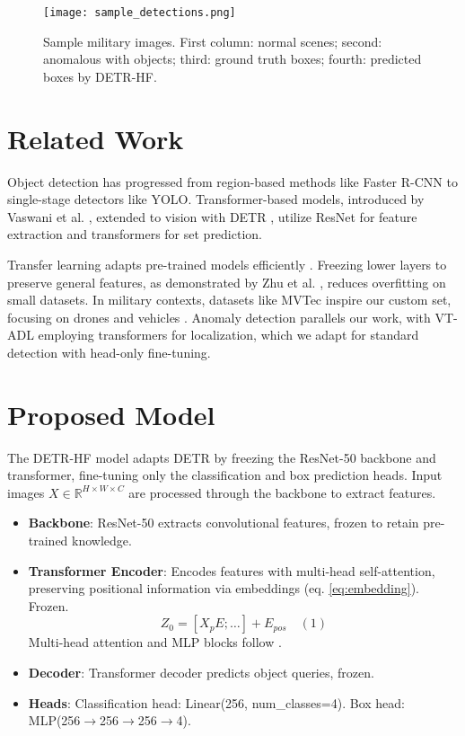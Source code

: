 \documentclass[12pt]{article}
\begin{document}
\begin{figure}[h]
    \centering
    \texttt{[image: sample\_detections.png]}
    \caption{Sample military images. First column: normal scenes; second: anomalous with objects; third: ground truth boxes; fourth: predicted boxes by DETR-HF.}
    \label{fig:samples}
\end{figure}

\section{Related Work}

Object detection has progressed from region-based methods like Faster R-CNN to single-stage detectors like YOLO. Transformer-based models, introduced by Vaswani et al. \cite{vaswani2017}, extended to vision with DETR \cite{carion2020}, utilize ResNet for feature extraction and transformers for set prediction.

Transfer learning adapts pre-trained models efficiently \cite{howard2018}. Freezing lower layers to preserve general features, as demonstrated by Zhu et al. \cite{zhu2021}, reduces overfitting on small datasets. In military contexts, datasets like MVTec \cite{bergmann2019} inspire our custom set, focusing on drones and vehicles \cite{li2022}. Anomaly detection parallels our work, with VT-ADL \cite{mishra2021} employing transformers for localization, which we adapt for standard detection with head-only fine-tuning.

\section{Proposed Model}

The DETR-HF model adapts DETR by freezing the ResNet-50 backbone and transformer, fine-tuning only the classification and box prediction heads. Input images \( X \in \mathbb{R}^{H \times W \times C} \) are processed through the backbone to extract features.

\begin{itemize}
    \item \textbf{Backbone}: ResNet-50 extracts convolutional features, frozen to retain pre-trained knowledge.
    \item \textbf{Transformer Encoder}: Encodes features with multi-head self-attention, preserving positional information via embeddings (eq. \ref{eq:embedding}). Frozen.
    \[
    Z_0 = [X_p E; \ldots] + E_{pos} \quad (1)
    \]
    Multi-head attention and MLP blocks follow \cite{vaswani2017}.
    \item \textbf{Decoder}: Transformer decoder predicts object queries, frozen.
    \item \textbf{Heads}: Classification head: Linear(256, num_classes=4). Box head: MLP(256$\rightarrow$256$\rightarrow$256$\rightarrow$4).
\end{itemize}
\end{document}
